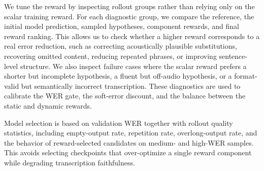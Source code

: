 \documentclass{article}
\begin{document}
We tune the reward by inspecting rollout groups rather than relying only on the
scalar training reward. For each diagnostic group, we compare the reference, the
initial model prediction, sampled hypotheses, component rewards, and final reward
ranking. This allows us to check whether a higher reward corresponds to a real
error reduction, such as correcting acoustically plausible substitutions,
recovering omitted content, reducing repeated phrases, or improving sentence-level
structure. We also inspect failure cases where the scalar reward prefers a
shorter but incomplete hypothesis, a fluent but off-audio hypothesis, or a
format-valid but semantically incorrect transcription. These diagnostics are used
to calibrate the WER gate, the soft-error discount, and the balance between the
static and dynamic rewards.

Model selection is based on validation WER together with rollout quality
statistics, including empty-output rate, repetition rate, overlong-output rate,
and the behavior of reward-selected candidates on medium- and high-WER samples.
This avoids selecting checkpoints that over-optimize a single reward component
while degrading transcription faithfulness.


\end{document}
